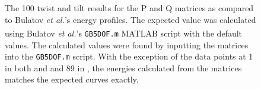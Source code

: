 \documentclass[twoside,senior]{BYUPhys}
\begin{document}
\begin{figure}[ht!]
 \centering
 
 \quad
 \caption[A comparison of the \textlangle{}100\textrangle{} copper curve with the calculated results.]{\label{fig:compare100} The \textlangle{}100\textrangle{} twist \protect{} and tilt \protect{} results for the P and Q matrices as compared to Bulatov \emph{et al.}'s energy profiles. The expected value was calculated using Bulatov \emph{et al.}'s \lstinline!GB5DOF.m! MATLAB\textsuperscript{\textregistered} script with the default values.  The calculated values were found by inputting the matrices into the \lstinline!GB5DOF.m! script. With the exception of the data points at 1\textdegree{} in both \protect{} and \protect{} and 89\textdegree{} in \protect{}, the energies calculated from the matrices matches the expected curves exactly.}
\end{figure}
\end{document}
